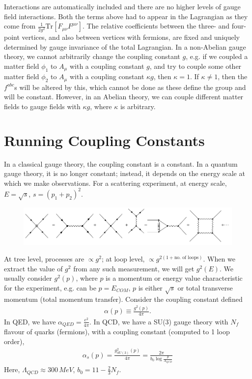 \documentclass[a4paper, 11pt, normalem]{report}
\begin{document}
Interactions are automatically included and there are no higher levels of gauge field interactions.
Both the terms above had to appear in the Lagrangian as they come from $\frac{1}{2g^2}\text{Tr}[F_{\mu\nu}F^{\mu\nu}]$.
The relative coefficients between the three- and four-point vertices, and also between vertices with fermions, are fixed and uniquely determined by gauge invariance of the total Lagrangian.
In a non-Abelian gauge theory, we cannot arbitrarily change the coupling constant $g$, e.g. if we coupled a matter field $\phi_1$ to $A_\mu$ with a coupling constant $g$, and try to couple some other matter field $\phi_2$ to $A_\mu$ with a coupling constant $\kappa g$, then $\kappa=1$.
If $\kappa\neq1$, then the $f^{abc}$s will be altered by this, which cannot be done as these define the group and will be constant.
However, in an Abelian theory, we can couple different matter fields to gauge fields with $\kappa g$, where $\kappa$ is arbitrary.

\section{Running Coupling Constants}
In a classical gauge theory, the coupling constant is a constant.
In a quantum gauge theory, it is no longer constant; instead, it depends on the energy scale at which we make observations.
For a scattering experiment, at energy scale, $E = \sqrt{s}$, $s=(p_1+p_2)^2$.
\begin{figure}[H]
    \centering
    \includegraphics[scale=0.5]{diagrams/loopsum.png}
\end{figure}
At tree level, processes are $\propto g^2$; at loop level, $\propto g^{2(1+\text{no. of loops})}$.
When we extract the value of $g^2$ from any such measurement, we will get $g^2(E)$.
We usually consider $g^2(p)$, where $p$ is a momentum or energy value characteristic for the experiment, e.g. can be $p=E_{COM}$, $p$ is either $\sqrt{s}$ or total transverse momentum (total momentum transfer).
Consider the coupling constant defined
\begin{align}
    \alpha(p) \equiv \frac{g^2(p)}{4\pi}.
\end{align}
In QED, we have $\alpha_{QED}=\frac{e^2}{4\pi}$.
In QCD, we have a SU(3) gauge theory with $N_f$ flavour of quarks (fermions), with a coupling constant (computed to 1 loop order),
\begin{align}
    \alpha_s(p) = \frac{g^2_{SU(3)}(p)}{4\pi} = \frac{2\pi}{b_0\log\frac{p}{\Lambda_{QCD}}}
\end{align}
Here, $\Lambda_{QCD}\approx300\,MeV$, $b_0=11-\frac23 N_f$.
\end{document}
